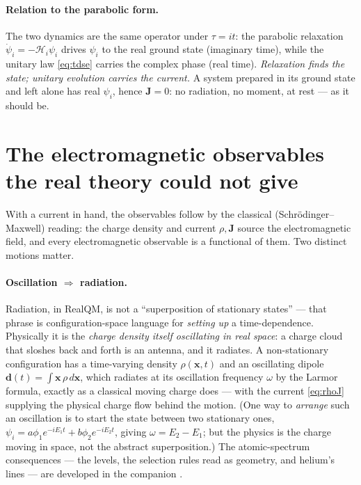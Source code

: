\documentclass[11pt]{article}
\begin{document}
\paragraph{Relation to the parabolic form.} The two dynamics are the same operator under
$\tau=it$: the parabolic relaxation $\dot\psi_i=-\mathcal H_i\psi_i$ drives $\psi_i$ to the real ground
state (imaginary time), while the unitary law \eqref{eq:tdse} carries the complex phase (real time).
\emph{Relaxation finds the state; unitary evolution carries the current.} A system prepared in its ground
state and left alone has real $\psi_i$, hence $\mathbf J=0$: no radiation, no moment, at rest --- as it
should be.

\section{The electromagnetic observables the real theory could not give}
\label{sec:obs}

With a current in hand, the observables follow by the classical (Schr\"odinger--Maxwell) reading: the
charge density and current $\rho,\mathbf J$ source the electromagnetic field, and every electromagnetic
observable is a functional of them. Two distinct motions matter.

\paragraph{Oscillation $\Rightarrow$ radiation.} Radiation, in RealQM, is not a ``superposition of
stationary states'' --- that phrase is configuration-space language for \emph{setting up} a
time-dependence. Physically it is the \emph{charge density itself oscillating in real space}: a charge
cloud that sloshes back and forth is an antenna, and it radiates. A non-stationary configuration has a
time-varying density $\rho(\mathbf x,t)$ and an oscillating dipole
$\mathbf d(t)=\int\mathbf x\,\rho\,d\mathbf x$, which radiates at its oscillation frequency $\omega$ by
the Larmor formula, exactly as a classical moving charge does --- with the current \eqref{eq:rhoJ}
supplying the physical charge flow behind the motion. (One way to \emph{arrange} such an oscillation is to
start the state between two stationary ones, $\psi_i = a\phi_1 e^{-iE_1t}+b\phi_2 e^{-iE_2t}$, giving
$\omega=E_2-E_1$; but the physics is the charge moving in space, not the abstract superposition.) The
atomic-spectrum consequences --- the levels, the selection rules read as geometry, and helium's lines ---
are developed in the companion \cite{Spectra}.
\end{document}
